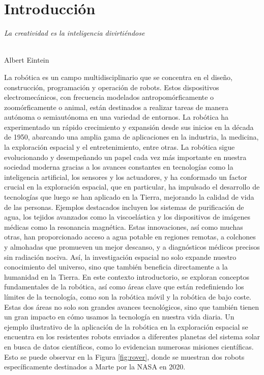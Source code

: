 \chapter{Introducción}
\label{cap:capitulo1}
\setcounter{page}{1}

\begin{flushright}
\begin{minipage}[]{10cm}
\emph{La creatividad es la inteligencia divirtiéndose}\\
\end{minipage}\\

Albert Eintein\\
\end{flushright}

\vspace{1cm}

La robótica es un campo multidisciplinario que se concentra en el diseño,
construcción, programación y operación de robots.
Estos dispositivos electromecánicos, con frecuencia modelados
antropomórficamente o zoomórficamente o animal, están destinados a realizar
tareas de manera autónoma o semiautónoma en una variedad de entornos.
La robótica ha experimentado un rápido crecimiento y expansión desde sus inicios
en la década de 1950, abarcando una amplia gama de aplicaciones en la industria,
la medicina, la exploración espacial y el entretenimiento, entre otras.
La robótica sigue evolucionando y desempeñando un papel cada vez más importante
en nuestra sociedad moderna gracias a los avances constantes en tecnologías como
la inteligencia artificial, los sensores y los actuadores, y ha conformado un
factor crucial en la exploración espacial, que en particular, ha impulsado el
desarrollo de tecnologías que luego se han aplicado en la Tierra, mejorando la
calidad de vida de las personas.
Ejemplos destacados incluyen los sistemas de purificación de agua, los tejidos
avanzados como la viscoelástica y los dispositivos de imágenes médicas como la
resonancia magnética.
Estas innovaciones, así como muchas otras, han proporcionado acceso a agua
potable en regiones remotas, a colchones y almohadas que promueven un mejor
descanso, y a diagnósticos médicos precisos sin radiación nociva.
Así, la investigación espacial no solo expande nuestro conocimiento del
universo, sino que también beneficia directamente a la humanidad en la Tierra.
En este contexto introductorio, se exploran conceptos fundamentales de la
robótica, así como áreas clave que están redefiniendo los límites de la
tecnología, como son la robótica móvil y la robótica de bajo coste.
Estas dos áreas no solo son grandes avances tecnológicos, sino que también
tienen un gran impacto en cómo usamos la tecnología en nuestra vida diaria.
Un ejemplo ilustrativo de la aplicación de la robótica en la exploración
espacial se encuentra en los resistentes robots enviados a diferentes planetas
del sistema solar en busca de datos científicos, como lo evidencian numerosas
misiones científicas.
Esto se puede observar en la Figura \ref{fig:rover}, donde se muestran dos
robots específicamente destinados a Marte por la NASA en 2020.


